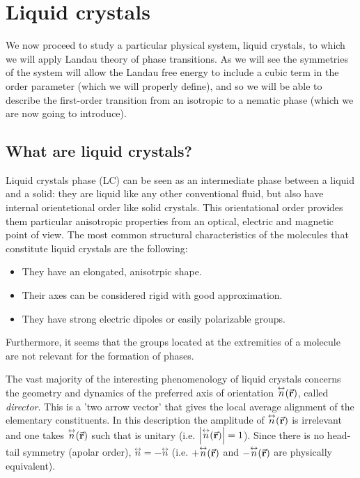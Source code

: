 \documentclass[../main/main.tex]{subfiles}
\begin{document}
\section{Liquid crystals}
We now proceed to study a particular physical system, liquid crystals, to which we will apply Landau theory of phase transitions. As we will see the symmetries of the system will allow the Landau free energy to include a cubic term in the order parameter (which we will properly define), and so we will be able to describe the first-order transition from an isotropic to a nematic phase (which we are now going to introduce).

\subsection{What are liquid crystals?}
Liquid crystals phase (LC) can be seen as an intermediate phase between a liquid and a solid: they are liquid like any other conventional fluid, but also have internal orientetional order like solid crystals. This orientational order provides them particular anisotropic properties from an optical, electric and magnetic point of view. The most common structural characteristics of the molecules that constitute liquid crystals are the following:
\begin{itemize}
\item They have an elongated, anisotrpic shape.
\item Their axes can be considered rigid with good approximation.
\item They have strong electric dipoles or easily polarizable groups.
\end{itemize}
Furthermore, it seems that the groups located at the extremities of a molecule are not relevant for the formation of phases.

The vast majority of the interesting phenomenology of liquid crystals concerns the geometry and dynamics of the preferred axis of orientation \( \overset{\leftrightarrow}{n} (\va{r}) \), called \emph{director}. This is a 'two arrow vector' that gives the local average alignment of the elementary constituents. In this description the amplitude of \( \overset{\leftrightarrow}{n} (\va{r}) \)    is irrelevant and one takes \( \overset{\leftrightarrow}{n} (\va{r}) \) such that is unitary (i.e. \( \abs{\overset{\leftrightarrow}{n} (\va{r})}  =1 \)).
 Since there is no head-tail symmetry (apolar order), \( \overset{\leftrightarrow}{n} = -  \overset{\leftrightarrow}{n}  \) (i.e.  \(+ \overset{\leftrightarrow}{n} (\va{r}) \) and \(- \overset{\leftrightarrow}{n} (\va{r}) \) are physically equivalent).
\end{document}
